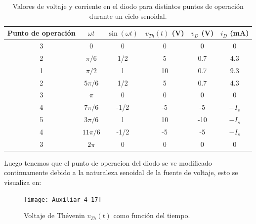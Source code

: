 \documentclass[
  11pt,
  letterpaper,
   addpoints,
   answers
  ]{exam}
\begin{document}
\begin{questions}
\begin{solution}
\begin{table}[H]
  \centering
  \begin{tabular}{c c c c c c}
    \hline
    Punto de operación & $\omega t$ & $\sin(\omega t)$ & $v_{Th}(t)$ (V) & $v_D$ (V) & $i_D$ (mA) \\
    \hline
    3 & 0 & 0 & 0 & 0 & 0 \\
    2 & $\pi/6$ & 1/2 & 5 & 0.7 & 4.3 \\
    1 & $\pi/2$ & 1 & 10 & 0.7 & 9.3 \\
    2 & $5\pi/6$ & 1/2 & 5 & 0.7 & 4.3 \\
    3 & $\pi$ & 0 & 0 & 0 & 0 \\
    4 & $7\pi/6$ & -1/2 & -5 & -5 & $-I_s$ \\
    5 & $3\pi/6$ & 1 & 10 & -10 & $-I_s$ \\
    4 & $11\pi/6$ & -1/2 & -5 & -5 & $-I_s$ \\
    3 & $2\pi$ & 0 & 0 & 0 & 0 \\
    \hline
  \end{tabular}
  \caption{Valores de voltaje y corriente en el diodo para distintos puntos de operación durante un ciclo senoidal.}
  \label{tab:diodo-operacion}
\end{table}
Luego tenemos que el punto de operacion del diodo se ve modificado continuamente debido a la naturaleza senoidal de la fuente de voltaje, esto se visualiza en:
\begin{figure}[H]
    \centering
\texttt{[image: Auxiliar\_4\_17]}
    \caption{Voltaje de Thévenin $v_{Th}(t)$ como función del tiempo.}
    \label{fig:voltaje-th}
\end{figure}


\end{solution}
\end{questions}
\end{document}
